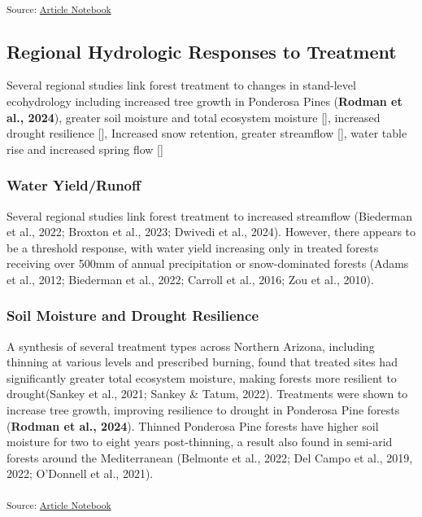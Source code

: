 \documentclass[
]{agujournal2019}
\begin{document}
\textsubscript{Source:
\href{https://Ryan3Lima.github.io/ATUR-ForestThinning/index.ipynb.html}{Article
Notebook}}

\subsection{Regional Hydrologic Responses to
Treatment}\label{regional-hydrologic-responses-to-treatment}

Several regional studies link forest treatment to changes in stand-level
ecohydrology including increased tree growth in Ponderosa Pines
(\textbf{Rodman et al., 2024}), greater soil moisture and total
ecosystem moisture {[}{]}, increased drought resilience {[}{]},
Increased snow retention, greater streamflow {[}{]}, water table rise
and increased spring flow {[}{]}

\subsubsection{Water Yield/Runoff}\label{water-yieldrunoff}

Several regional studies link forest treatment to increased streamflow
(Biederman et al., 2022; Broxton et al., 2023; Dwivedi et al., 2024).
However, there appears to be a threshold response, with water yield
increasing only in treated forests receiving over 500mm of annual
precipitation or snow-dominated forests (Adams et al., 2012; Biederman
et al., 2022; Carroll et al., 2016; Zou et al., 2010).

\subsubsection{Soil Moisture and Drought
Resilience}\label{soil-moisture-and-drought-resilience}

A synthesis of several treatment types across Northern Arizona,
including thinning at various levels and prescribed burning, found that
treated sites had significantly greater total ecosystem moisture, making
forests more resilient to drought(Sankey et al., 2021; Sankey \& Tatum,
2022). Treatments were shown to increase tree growth, improving
resilience to drought in Ponderosa Pine forests (\textbf{Rodman et al.,
2024}). Thinned Ponderosa Pine forests have higher soil moisture for two
to eight years post-thinning, a result also found in semi-arid forests
around the Mediterranean (Belmonte et al., 2022; Del Campo et al., 2019,
2022; O'Donnell et al., 2021).

\textsubscript{Source:
\href{https://Ryan3Lima.github.io/ATUR-ForestThinning/index.ipynb.html}{Article
Notebook}}
\end{document}
